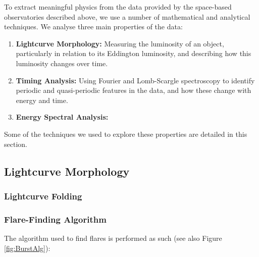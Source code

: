 \par To extract meaningful physics from the data provided by the space-based observatories described above, we use a number of mathematical and analytical techniques.  We analyse three main properties of the data:
\begin{enumerate}
\item \textbf{Lightcurve Morphology:} Measuring the luminosity of an object, particularly in relation to its Eddington luminosity, and describing how this luminosity changes over time.
\item \textbf{Timing Analysis:} Using Fourier and Lomb-Scargle spectroscopy to identify periodic and quasi-periodic features in the data, and how these change with energy and time.
\item \textbf{Energy Spectral Analysis:}
\end{enumerate}
\par Some of the techniques we used to explore these properties are detailed in this section.

\subsection{Lightcurve Morphology}

\subsubsection{Lightcurve Folding}

\subsubsection{Flare-Finding Algorithm}
\label{sec:Flares}

\par The algorithm used to find flares is performed as such (see also Figure \ref{fig:BurstAlg}):

